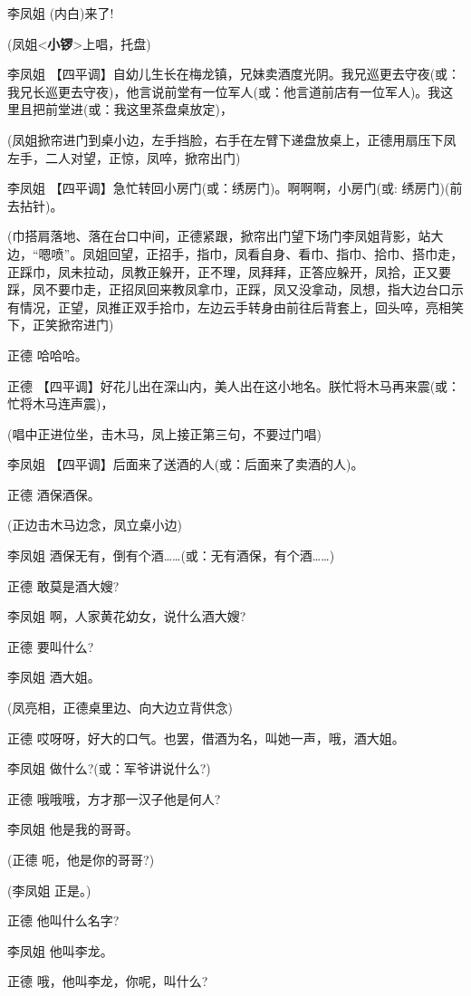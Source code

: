 李凤姐 (内白)来了!

(凤姐\textless{}\textbf{小锣}\textgreater{}上唱，托盘)

李凤姐
【四平调】自幼儿生长在梅龙镇，兄妹卖酒度光阴。我兄巡更去守夜(或：我兄长巡更去守夜)，他言说前堂有一位军人(或：他言道前店有一位军人)。我这里且把前堂进(或：我这里茶盘桌放定)，

(凤姐掀帘进门到桌小边，左手挡脸，右手在左臂下递盘放桌上，正德用扇压下凤左手，二人对望，正惊，凤啐，掀帘出门)

李凤姐 【四平调】急忙转回小房门(或：绣房门)。啊啊啊，小房门(或:
绣房门)(前去拈针)。

(巾搭肩落地、落在台口中间，正德紧跟，掀帘出门望下场门李凤姐背影，站大边，``嗯喷''。凤姐回望，正招手，指巾，凤看自身、看巾、指巾、拾巾、搭巾走，正踩巾，凤未拉动，凤教正躲开，正不理，凤拜拜，正答应躲开，凤拾，正又要踩，凤不要巾走，正招凤回来教凤拿巾，正踩，凤又没拿动，凤想，指大边台口示有情况，正望，凤推正双手拾巾，左边云手转身由前往后背套上，回头啐，亮相笑下，正笑掀帘进门)

正德 哈哈哈。

正德
【四平调】好花儿出在深山内，美人出在这小地名。朕忙将木马再来震(或：忙将木马连声震)，

(唱中正进位坐，击木马，凤上接正第三句，不要过门唱)

李凤姐 【四平调】后面来了送酒的人(或：后面来了卖酒的人)。

正德 酒保酒保。

(正边击木马边念，凤立桌小边)

李凤姐
酒保无有，倒有个酒\ldots{}\ldots{}(或：无有酒保，有个酒\ldots{}\ldots{})

正德 敢莫是酒大嫂?

李凤姐 啊，人家黄花幼女，说什么酒大嫂?

正德 要叫什么?

李凤姐 酒大姐。

(凤亮相，正德桌里边、向大边立背供念)

正德 哎呀呀，好大的口气。也罢，借酒为名，叫她一声，哦，酒大姐。

李凤姐 做什么?(或：军爷讲说什么?)

正德 哦哦哦，方才那一汉子他是何人?

李凤姐 他是我的哥哥。

(正德 呃，他是你的哥哥?)

(李凤姐 正是。)

正德 他叫什么名字?

李凤姐 他叫李龙。

正德 哦，他叫李龙，你呢，叫什么?

